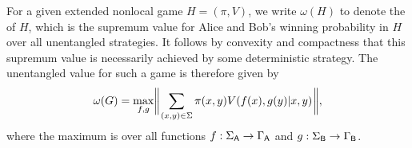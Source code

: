 
For a given extended nonlocal game $H = (\pi,V)$, we write $\omega(H)$ to denote the  of $H$, which is the supremum value for Alice and Bob's winning probability in $H$ over all unentangled strategies. It follows by convexity and compactness that this supremum value is necessarily achieved by some deterministic strategy. The unentangled value for such a game is therefore given by
\begin{align} \label{eq:enlg-unentangled-value}
\omega(G) = \max_{f,g} \biggl\lVert\mspace{1mu}  \sum_{(x,y) \in \Sigma} \pi(x,y) V(f(x),g(y)|x,y)  \mspace{1mu}\biggr\rVert,
\end{align}
where the maximum is over all functions $f : \Sigma_{\mathsf{A}} \rightarrow \Gamma_{\mathsf{A}}$ and $g: \Sigma_{\mathsf{B}} \rightarrow \Gamma_{\mathsf{B}}$. 


